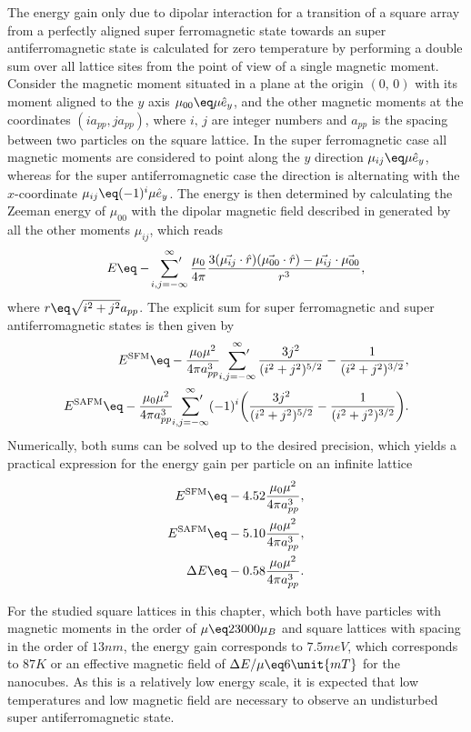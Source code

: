 \documentclass[\main/dresen_thesis.tex]{subfiles}
\begin{document}
  The energy gain only due to dipolar interaction for a transition of a square array from a perfectly aligned super ferromagnetic state towards an super antiferromagnetic state is calculated for zero temperature by performing a double sum over all lattice sites from the point of view of a single magnetic moment.
  Consider the magnetic moment situated in a plane at the origin $(0, \,0)$ with its moment aligned to the $y$ axis $\mu_{00} \eq \mu \hat{e}_y$, and the other magnetic moments at the coordinates $(i a_{pp}, j a_{pp})$, where $i,\, j$ are integer numbers and $a_{pp}$ is the spacing between two particles on the square lattice.
  In the super ferromagnetic case all magnetic moments are considered to point along the $y$ direction $\mu_{ij} \eq \mu \hat{e}_y$, whereas for the super antiferromagnetic case the direction is alternating with the $x$-coordinate $\mu_{ij} \eq (-1)^i \mu \hat{e}_y$.
  The energy is then determined by calculating the Zeeman energy of $\mu_{00}$ with the dipolar magnetic field described in  generated by all the other moments $\mu_{ij}$, which reads
  \begin{align}
    E \eq -\sideset{}{'}\sum_{i,j=-\infty}^\infty \frac{\mu_0}{4 \pi} \frac{3(\vec{\mu_{ij}} \cdot \hat{r})(\vec{\mu_{00}} \cdot \hat{r}) - \vec{\mu_{ij}} \cdot \vec{\mu_{00}} }{r^3},
  \end{align}
  where $r \eq \sqrt{i^2 + j^2} a_{pp}$.
  The explicit sum for super ferromagnetic and super antiferromagnetic states is then given by
  \begin{align}
    E^\mathrm{SFM} \eq -\frac{\mu_0 \mu^2}{4 \pi a^3_{pp}} \sideset{}{'}\sum_{i,j=-\infty}^\infty  \frac{3j^2}{(i^2 + j^2)^{5/2}} - \frac{1}{(i^2 + j^2)^{3/2}} ,\\
    E^\mathrm{SAFM} \eq -\frac{\mu_0 \mu^2}{4 \pi a^3_{pp}} \sideset{}{'}\sum_{i,j=-\infty}^\infty (-1)^i \biggl( \frac{3j^2}{(i^2 + j^2)^{5/2}} - \frac{1}{(i^2 + j^2)^{3/2}} \biggr).
  \end{align}
  Numerically, both sums can be solved up to the desired precision, which yields a practical expression for the energy gain per particle on an infinite lattice
  \begin{align}
    E^\mathrm{SFM} &\eq -4.52 \frac{\mu_0 \mu^2}{4 \pi a^3_{pp}},\\
    E^\mathrm{SAFM} &\eq -5.10 \frac{\mu_0 \mu^2}{4 \pi a^3_{pp}},\\
    \Delta E &\eq -0.58 \frac{\mu_0 \mu^2}{4 \pi a^3_{pp}}.
  \end{align}

  For the studied square lattices in this chapter, which both have particles with magnetic moments in the order of $\mu \eq 23000 \mu_B$ and square lattices with spacing in the order of $13 \unit{nm}$, the energy gain corresponds to $7.5 \unit{meV}$, which corresponds to $87 \unit{K}$ or an effective magnetic field of $\Delta E / \mu \eq 6 \unit{mT}$ for the nanocubes.
  As this is a relatively low energy scale, it is expected that low temperatures and low magnetic field are necessary to observe an undisturbed super antiferromagnetic state.
\end{document}
